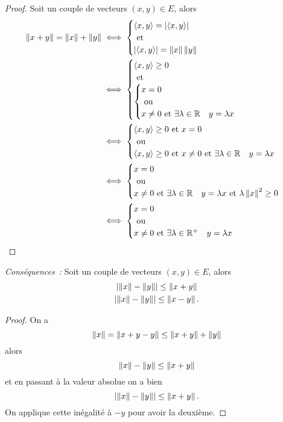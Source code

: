 \begin{proof}
  Soit un couple de  vecteurs $(x,y) \in E$, alors
  \begin{align}
    \left\lVert x+y\right\rVert = \left\lVert x\right\rVert+\left\lVert y\right\rVert &\iff \begin{cases} \left\langle{x},{y}\right\rangle = \left\lvert\left\langle{x},{y}\right\rangle\right\rvert \\ \text{~et~} \\ \left\lvert\left\langle{x},{y}\right\rangle\right\rvert = \left\lVert x\right\rVert\left\lVert y\right\rVert\end{cases} \\
    &\iff  \begin{cases}  \left\langle{x},{y}\right\rangle \geq 0 \\ \text{~et~} \\ \begin{cases} x=0 \\ \text{~ou~} \\ x\neq 0 \text{~et~} \exists \lambda \in \mathbb{R} \quad y=\lambda x\end{cases} \end{cases}\\
    & \iff \begin{cases} \left\langle{x},{y}\right\rangle \geq 0 \text{~et~} x =0 \\ \text{~ou~} \\  \left\langle{x},{y}\right\rangle \geq 0 \text{~et~} x \neq 0 \text{~et~} \exists \lambda \in \mathbb{R} \quad y=\lambda x \end{cases}\\
    & \iff \begin{cases} x=0 \\ \text{~ou~} \\ x \neq 0 \text{~et~} \exists \lambda \in \mathbb{R} \quad y=\lambda x \text{~et~} \lambda\left\lVert x\right\rVert^2 \geq 0 \end{cases} \\
      & \iff \begin{cases} x=0 \\ \text{~ou~} \\ x \neq 0 \text{~et~} \exists \lambda \in \mathbb{R}^{+} \quad y=\lambda x \end{cases}
  \end{align}
\end{proof}

\emph{Conséquences~:} Soit un couple de  vecteurs $(x,y) \in E$, alors
\begin{gather}
  \left\lvert\left\lVert x\right\rVert-\left\lVert y\right\rVert\right\rvert \leq \left\lVert x+y\right\rVert\\
  \left\lvert\left\lVert x\right\rVert-\left\lVert y\right\rVert\right\rvert \leq \left\lVert x-y\right\rVert.
\end{gather}
\begin{proof}
  On a
  \begin{equation}
    \left\lVert x\right\rVert = \left\lVert x+y-y\right\rVert \leq \left\lVert x+y\right\rVert +\left\lVert y\right\rVert
  \end{equation}
  alors
  \begin{equation}
    \left\lVert x\right\rVert - \left\lVert y\right\rVert \leq \left\lVert x+y\right\rVert
  \end{equation}
  et en passant à la valeur absolue on a bien
  \begin{equation}
    \left\lvert\left\lVert x\right\rVert-\left\lVert y\right\rVert\right\rvert \leq \left\lVert x+y\right\rVert.
  \end{equation}
  On applique cette inégalité à $-y$ pour avoir la deuxième.
\end{proof}

